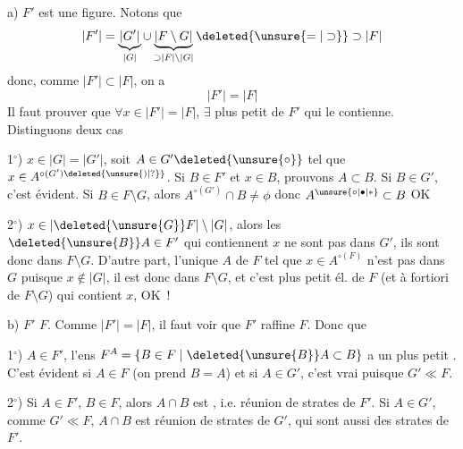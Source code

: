 a) $F'$ est une figure.  Notons que 
\[
 |F'|=\underbrace{|G'|}_{|G|}\cup\underbrace{|F\setminus G|}_{\supset |F|\setminus |G|}\deleted{\unsure{=|\supset}}\supset |F|
\]
donc, comme $|F'|\subset |F|$, on a
\[
 |F'|=|F|
\]
Il faut prouver que $\forall x\in |F'|=|F|$, $\exists$ plus petit  de $F'$ qui le contienne. Distinguons deux cas

1$^\circ$) $x\in |G|=|G'|$, soit $A\in G'\deleted{\unsure{\circ}}$ tel que $x\in A^{\circ(G')\deleted{\unsure{)|?}}}$. Si $B\in F'$ et  $x\in B$, prouvons $A\subset B$. Si $B\in G'$, c'est évident. Si $B\in F\setminus G$, alors  $A^{\circ(G')}\cap B\ne\phi$ donc $A^{\unsure{\circ|\bullet|*}}\subset B$ OK

2$^\circ$) $x\in |\deleted{\unsure{G}}F|\setminus |G|$, alors les $\deleted{\unsure{B}}A\in F'$ qui contiennent $x$ ne sont pas dans $G'$, ils sont donc dans $F\setminus G$. D'autre part, l'unique  $A$ de $F$ tel que $x\in A^{\circ(F)}$ n'est pas dans $G$ puisque $x\notin |G|$, il est donc dans $F\setminus G$, et  c'est  plus petit él. de $F$ (et à fortiori de $F\setminus G$) qui contient $x$, OK~!

b) $F'$  $F$. Comme $|F'|=|F|$, il faut voir  que $F'$ raffine $F$. Donc  que

1$^\circ$) \deleted{$\forall$} $A\in F'$, l'ens $F^A=\{B\in F\mid \deleted{\unsure{B}}A\subset B\}$ a un plus petit . C'est évident si $A\in F$  (on prend $B=A$) et si $A\in G'$, c'est vrai puisque $G'\ll F$.

2$^\circ$) Si $A\in F'$, $B\in F$, alors $A\cap B$ est , i.e. réunion de strates de $F'$. Si $A\in G'$, comme $G'\ll F$, $A\cap B$ est réunion de strates de $G'$, qui sont aussi des strates de $F'$.
